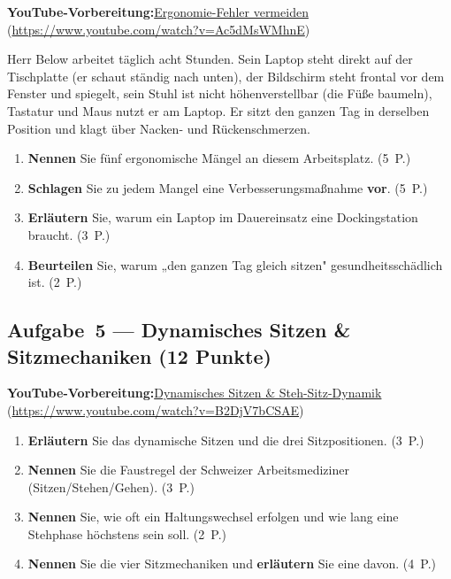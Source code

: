 \documentclass[11pt, a4paper]{article}
\begin{document}
\noindent\textbf{\color{bfwAccent}YouTube-Vorbereitung:}\enspace \href{https://www.youtube.com/watch?v=Ac5dMsWMhnE}{Ergonomie-Fehler vermeiden} (\url{https://www.youtube.com/watch?v=Ac5dMsWMhnE})

\medskip
Herr Below arbeitet täglich acht Stunden. Sein Laptop steht direkt auf der Tischplatte
(er schaut ständig nach unten), der Bildschirm steht frontal vor dem Fenster und spiegelt,
sein Stuhl ist nicht höhenverstellbar (die Füße baumeln), Tastatur und Maus nutzt er am
Laptop. Er sitzt den ganzen Tag in derselben Position und klagt über Nacken- und Rücken\-schmerzen.

\begin{enumerate}[label=(\alph*)]
  \item \textbf{Nennen} Sie fünf ergonomische Mängel an diesem Arbeitsplatz. \hfill (5~P.)
  \item \textbf{Schlagen} Sie zu jedem Mangel eine Verbesserungsmaßnahme \textbf{vor}. \hfill (5~P.)
  \item \textbf{Erläutern} Sie, warum ein Laptop im Dauereinsatz eine Dockingstation braucht. \hfill (3~P.)
  \item \textbf{Beurteilen} Sie, warum „den ganzen Tag gleich sitzen" gesundheitsschädlich ist. \hfill (2~P.)
\end{enumerate}

\subsection*{Aufgabe~5 --- Dynamisches Sitzen \& Sitzmechaniken (12 Punkte)}

\noindent\textbf{\color{bfwAccent}YouTube-Vorbereitung:}\enspace \href{https://www.youtube.com/watch?v=B2DjV7bCSAE}{Dynamisches Sitzen \& Steh-Sitz-Dynamik} (\url{https://www.youtube.com/watch?v=B2DjV7bCSAE})

\medskip
\begin{enumerate}[label=(\alph*)]
  \item \textbf{Erläutern} Sie das dynamische Sitzen und die drei Sitzpositionen. \hfill (3~P.)
  \item \textbf{Nennen} Sie die Faustregel der Schweizer Arbeitsmediziner (Sitzen/Stehen/Gehen). \hfill (3~P.)
  \item \textbf{Nennen} Sie, wie oft ein Haltungswechsel erfolgen und wie lang eine Stehphase höchstens sein soll. \hfill (2~P.)
  \item \textbf{Nennen} Sie die vier Sitzmechaniken und \textbf{erläutern} Sie eine davon. \hfill (4~P.)
\end{enumerate}
\end{document}
